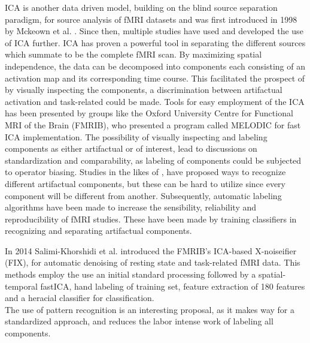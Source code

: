ICA is another data driven model, building on the blind source separation paradigm, for source analysis of fMRI datasets and was first introduced in 1998 by Mckeown et al. \cite{Mckeown1998}. Since then, multiple studies \cite{Calhoun2001a,Deslauriers2017,Parkes2018,Du2018,Tohka2008} have used and developed the use of ICA further. ICA has proven a powerful tool in separating the different sources which summate to be the complete fMRI scan. By maximizing spatial independence, the data can be decomposed into components each consisting of an activation map and its corresponding time course. \cite{Salimi-Khorshidi2014} This facilitated the prospect of by visually inspecting the components, a discrimination between artifactual activation and task-related could be made. Tools for easy employment of the ICA has been presented by groups like the Oxford University Centre for Functional MRI of the Brain (FMRIB), who presented a program called MELODIC for fast ICA implementation. \cite{FMRIB2016} The possibility of visually inspecting and labeling components as either artifactual or of interest, lead to discussions on standardization and comparability, as labeling of components could be subjected to operator biasing. Studies in the likes of \cite{Salimi-Khorshidi2014,Griffanti2017}, have proposed ways to recognize different artifactual components, but these can be hard to utilize since every component will be different from another. Subsequently, automatic labeling algorithms have been made to increase the sensibility, reliability and reproducibility of fMRI studies. These have been made by training classifiers in recognizing and separating artifactual components. \cite{Tohka2008}

In 2014 Salimi-Khorshidi et al. \cite{Salimi-Khorshidi2014} introduced the FMRIB's ICA-based X-noiseifier (FIX), for automatic denoising of resting state and task-related fMRI data. This methods employ the use an initial standard processing followed by a spatial-temporal fastICA, hand labeling of training set, feature extraction of 180 features and a heracial classifier for classification. \cite{Salimi-Khorshidi2014} \\
The use of pattern recognition is an interesting proposal, as it makes way for a standardized approach, and reduces the labor intense work of labeling all components.   

